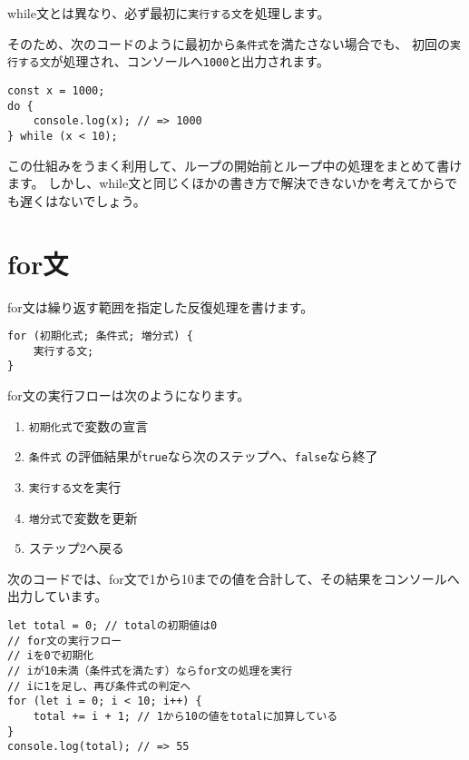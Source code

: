 while文とは異なり、必ず最初に\texttt{実行する文}を処理します。

そのため、次のコードのように最初から\texttt{条件式}を満たさない場合でも、
初回の\texttt{実行する文}が処理され、コンソールへ\texttt{1000}と出力されます。

\begin{lstlisting}
const x = 1000;
do {
    console.log(x); // => 1000
} while (x < 10);
\end{lstlisting}

この仕組みをうまく利用して、ループの開始前とループ中の処理をまとめて書けます。
しかし、while文と同じくほかの書き方で解決できないかを考えてからでも遅くはないでしょう。

\hypertarget{for-statement}{%
\section{for文}\label{for-statement}}

for文は繰り返す範囲を指定した反復処理を書けます。

\begin{lstlisting}
for (初期化式; 条件式; 増分式) {
    実行する文;
}
\end{lstlisting}

for文の実行フローは次のようになります。

\begin{enumerate}
\def\labelenumi{\arabic{enumi}.}
\item
  \texttt{初期化式}で変数の宣言
\item
  \texttt{条件式}
  の評価結果が\texttt{true}なら次のステップへ、\texttt{false}なら終了
\item
  \texttt{実行する文}を実行
\item
  \texttt{増分式}で変数を更新
\item
  ステップ2へ戻る
\end{enumerate}

次のコードでは、for文で1から10までの値を合計して、その結果をコンソールへ出力しています。

\begin{lstlisting}
let total = 0; // totalの初期値は0
// for文の実行フロー
// iを0で初期化
// iが10未満（条件式を満たす）ならfor文の処理を実行
// iに1を足し、再び条件式の判定へ
for (let i = 0; i < 10; i++) {
    total += i + 1; // 1から10の値をtotalに加算している
}
console.log(total); // => 55
\end{lstlisting}


